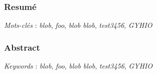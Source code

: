 \pagestyle{empty}
\subsubsection*{Resumé}
\textit{Mots-clés} : \textit{blob}, \textit{foo}, \textit{blob blob}, \textit{test3456}, \textit{GYHIO}

\blindtext[2]


\subsubsection*{Abstract}
\textit{Keywords} : \textit{blob}, \textit{foo}, \textit{blob blob}, \textit{test3456}, \textit{GYHIO}

\blindtext[2]
